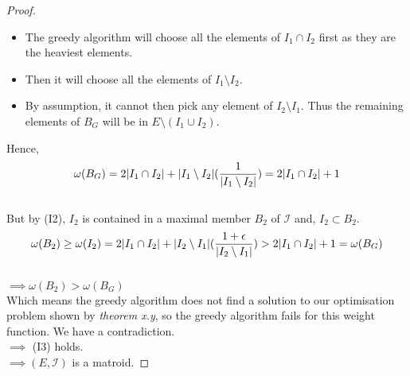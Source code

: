 \documentclass[../main.tex]{subfiles}
\begin{document}
\begin{proof}
\begin{itemize}
\item The greedy algorithm will choose all the elements of $I_1 \cap I_2$ first as they are the heaviest elements.
\item Then it will choose all the elements of $I_1 \setminus I_2.$
\item By assumption, it cannot then pick any element of $I_2 \setminus I_1.$ Thus the remaining elements of $B_G$ will be in $E \setminus (I_1 \cup I_2).$\\
\end{itemize}
Hence,\[
\omega(B_G) = 2|I_1 \cap I_2| + |I_1 \setminus I_2|(\frac{1}{|I_1 \setminus I_2|})\\
= 2|I_1 \cap I_2| + 1
\]\\
But by (I2), $I_2$ is contained in a maximal member $B_2$ of $\mathcal{I}$ and, $I_2 \subset B_2.$\\
\[
\omega(B_2) \geq \omega(I_2) = 2|I_1 \cap I_2| + |I_2 \setminus I_1|(\frac{1+\epsilon}{|I_2 \setminus I_1|})\\
> 2|I_1 \cap I_2| + 1 = \omega(B_G)
\]\\
$\implies \omega(B_2) > \omega(B_G)$\\
Which means the greedy algorithm does not find a solution to our optimisation problem shown by \textit{theorem x.y}, so the greedy algorithm fails for this weight function. We have a contradiction.\\
$\implies$ (I3) holds.\\
$\implies (E,\mathcal{I})$ is a matroid.
\end{proof}
\end{document}
